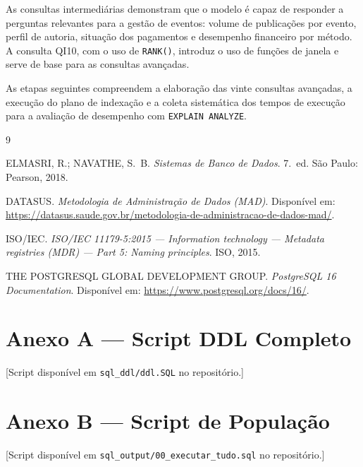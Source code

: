 \documentclass[12pt]{article}
\begin{document}
As consultas intermediárias demonstram que o modelo é capaz de responder a perguntas relevantes para a gestão de eventos: volume de publicações por evento, perfil de autoria, situação dos pagamentos e desempenho financeiro por método. A consulta QI10, com o uso de \texttt{RANK()}, introduz o uso de funções de janela e serve de base para as consultas avançadas.

As etapas seguintes compreendem a elaboração das vinte consultas avançadas, a execução do plano de indexação e a coleta sistemática dos tempos de execução para a avaliação de desempenho com \texttt{EXPLAIN ANALYZE}.

\begin{thebibliography}{9}

ELMASRI, R.; NAVATHE, S.~B.
\emph{Sistemas de Banco de Dados}. 7.~ed. São Paulo: Pearson, 2018.

DATASUS.
\emph{Metodologia de Administração de Dados (MAD)}.
Disponível em: \url{https://datasus.saude.gov.br/metodologia-de-administracao-de-dados-mad/}.

ISO/IEC.
\emph{ISO/IEC 11179-5:2015 --- Information technology --- Metadata registries (MDR) --- Part 5: Naming principles}.
ISO, 2015.

THE POSTGRESQL GLOBAL DEVELOPMENT GROUP.
\emph{PostgreSQL 16 Documentation}.
Disponível em: \url{https://www.postgresql.org/docs/16/}.

\end{thebibliography}

\appendix
\section{Anexo A --- Script DDL Completo}
\label{anx:ddl}
% 
[Script disponível em \texttt{sql\_ddl/ddl.SQL} no repositório.]

\section{Anexo B --- Script de População}
\label{anx:populacao}
% 
[Script disponível em \texttt{sql\_output/00\_executar\_tudo.sql} no repositório.]
\end{document}
